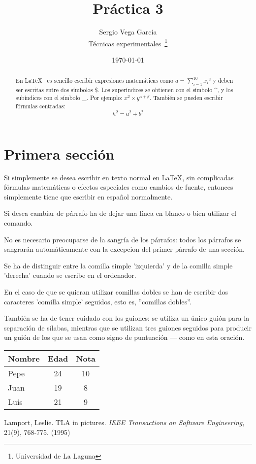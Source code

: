 \documentclass[a4paper,12pt]{article}
\begin{document}
\title{Práctica 3}
\author{Sergio Vega García \\
        Técnicas experimentales~\footnote{Universidad de La Laguna}
        }
\date{\today}
\maketitle
\begin{abstract}
   En \LaTeX{}~\cite{Lam:86} es sencillo escribir expresiones
   matemáticas como $a=\sum_{i=1}^{10} {x_i}^{3}$
   y deben ser escritas entre dos símbolos \$.
   Los superíndices se obtienen con el símbolo \^{}, y
   los subíndices con el símbolo \_.
   Por ejemplo: $x^2 \times y^{\alpha + \beta}$.
   También se pueden escribir fórmulas centradas:
   \[h^2=a^2 + b^2 \]
\end{abstract}

\section{Primera sección}
Si simplemente se desea escribir en texto normal en LaTeX,
sin complicadas f\'ormulas matem\'aticas o efectos especiales
como cambios de fuente, entonces simplemente tiene que escribir
en espa\~nol normalmente.\par
Si desea cambiar de párrafo ha de dejar una línea en blanco o bien
utilizar el comando. \par
No es necesario preocuparse de la sangría de los párrafos:
todos los párrafos se sangrarán automáticamente con la excepcion
del primer párrafo de una sección.

Se ha de distinguir entre la comilla simple 'izquierda'
y de la comilla simple 'derecha' cuando se escribe en el ordenador.

En el caso de que se quieran utilizar comillas dobles se han de
escribir dos caracteres 'comilla simple' seguidos, esto es,
''comillas dobles''.

También se ha de tener cuidado con los guiones: se utiliza un único
guión para la separación de sílabas, mientras que se utilizan
tres guiones seguidos para producir un guión de los que se usan
como signo de puntuación --- como en esta oración.

\bigskip
\begin{tabular}{|l|c|c|}
\hline
  Nombre & Edad & Nota \\ \hline
  Pepe   & 24   &  10  \\ \hline
  Juan   & 19   &  8   \\ \hline
  Luis   & 21   &  9   \\ \hline
\end{tabular}


\begin{thebibliography}{00}
    Lamport, Leslie.
    TLA in pictures.
    \emph{IEEE Transactions on Software Engineering},
    21(9), 768-775.
    (1995)
\end{thebibliography}
\end{document}
